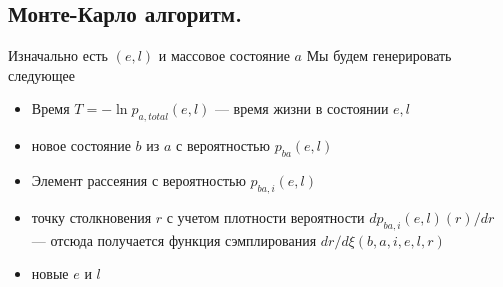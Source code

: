 \documentclass[a4paper, 14pt]{article}
\begin{document}
\subsection{Монте-Карло алгоритм.}
Изначально есть $(e,l)$ и массовое состояние $a$
Мы будем генерировать следующее
\begin{itemize}
	\item Время $T = -\ln{p_{a, total}(e,l)}$ --- время жизни в состоянии $e,l$
	\item новое состояние $b$ из $a$ с вероятностью $p_{ba}(e,l)$
	\item Элемент рассеяния с вероятностью $p_{ba, i}(e,l)$
	\item точку столкновения $r$ с учетом плотности вероятности $dp_{ba,i}(e,l)(r)/dr$ --- отсюда получается функция сэмплирования $dr/d\xi(b,a,i, e,l,r)$
	\item новые $e$ и $l$
	
\end{itemize}


\end{document}
